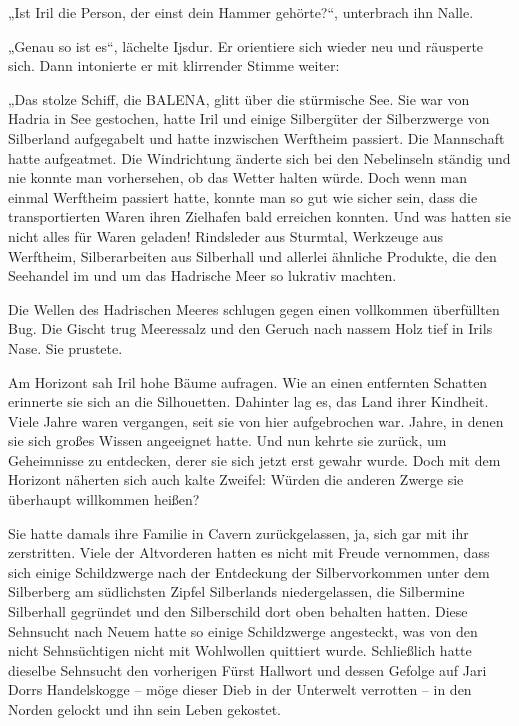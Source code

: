 „Ist Iril die Person, der einst dein Hammer gehörte?“, unterbrach ihn Nalle.

„Genau so ist es“, lächelte Ijsdur. Er orientiere sich wieder neu und räusperte sich. Dann intonierte er mit klirrender Stimme weiter:

„Das stolze Schiff, die BALENA, glitt über die stürmische See. Sie war von Hadria in See gestochen, hatte Iril und einige Silbergüter der Silberzwerge von Silberland aufgegabelt und hatte inzwischen Werftheim passiert. Die Mannschaft hatte aufgeatmet. Die Windrichtung änderte sich bei den Nebelinseln ständig und nie konnte man vorhersehen, ob das Wetter halten würde. Doch wenn man einmal Werftheim passiert hatte, konnte man so gut wie sicher sein, dass die transportierten Waren ihren Zielhafen bald erreichen konnten. Und was hatten sie nicht alles für Waren geladen! Rindsleder aus Sturmtal, Werkzeuge aus Werftheim, Silberarbeiten aus Silberhall und allerlei ähnliche Produkte, die den Seehandel im und um das Hadrische Meer so lukrativ machten.

Die Wellen des Hadrischen Meeres schlugen gegen einen vollkommen überfüllten Bug. Die Gischt trug Meeressalz und den Geruch nach nassem Holz tief in Irils Nase. Sie prustete.

Am Horizont sah Iril hohe Bäume aufragen. Wie an einen entfernten Schatten erinnerte sie sich an die Silhouetten. Dahinter lag es, das Land ihrer Kindheit. Viele Jahre waren vergangen, seit sie von hier aufgebrochen war. Jahre, in denen sie sich großes Wissen angeeignet hatte. Und nun kehrte sie zurück, um Geheimnisse zu entdecken, derer sie sich jetzt erst gewahr wurde. Doch mit dem Horizont näherten sich auch kalte Zweifel: Würden die anderen Zwerge sie überhaupt willkommen heißen?

Sie hatte damals ihre Familie in Cavern zurückgelassen, ja, sich gar mit ihr zerstritten. Viele der Altvorderen hatten es nicht mit Freude vernommen, dass sich einige Schildzwerge nach der Entdeckung der Silbervorkommen unter dem Silberberg am südlichsten Zipfel Silberlands niedergelassen, die Silbermine Silberhall gegründet und den Silberschild dort oben behalten hatten. Diese Sehnsucht nach Neuem hatte so einige Schildzwerge angesteckt, was von den nicht Sehnsüchtigen nicht mit Wohlwollen quittiert wurde. Schließlich hatte dieselbe Sehnsucht den vorherigen Fürst Hallwort und dessen Gefolge auf Jari Dorrs Handelskogge – möge dieser Dieb in der Unterwelt verrotten – in den Norden gelockt und ihn sein Leben gekostet.

